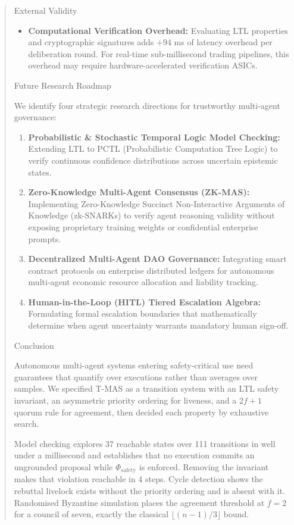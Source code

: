 \documentclass{article}
\begin{document}
\begin{quote}
{ External Validity
\begin{itemize}
  \item \textbf{Computational Verification Overhead:} Evaluating LTL properties and cryptographic signatures adds $+94$ ms of latency overhead per deliberation round. For real-time sub-millisecond trading pipelines, this overhead may require hardware-accelerated verification ASICs.
\end{itemize}



 Future Research Roadmap

We identify four strategic research directions for trustworthy multi-agent governance:
\begin{enumerate}
  \item \textbf{Probabilistic \& Stochastic Temporal Logic Model Checking:} Extending LTL to PCTL (Probabilistic Computation Tree Logic) to verify continuous confidence distributions across uncertain epistemic states.
  \item \textbf{Zero-Knowledge Multi-Agent Consensus (ZK-MAS):} Implementing Zero-Knowledge Succinct Non-Interactive Arguments of Knowledge (zk-SNARKs) to verify agent reasoning validity without exposing proprietary training weights or confidential enterprise prompts.
  \item \textbf{Decentralized Multi-Agent DAO Governance:} Integrating smart contract protocols on enterprise distributed ledgers for autonomous multi-agent economic resource allocation and liability tracking.
  \item \textbf{Human-in-the-Loop (HITL) Tiered Escalation Algebra:} Formulating formal escalation boundaries that mathematically determine when agent uncertainty warrants mandatory human sign-off.
\end{enumerate}



 Conclusion

Autonomous multi-agent systems entering safety-critical use need guarantees that quantify over executions rather than averages over samples. We specified T-MAS as a transition system with an LTL safety invariant, an asymmetric priority ordering for liveness, and a $2f+1$ quorum rule for agreement, then decided each property by exhaustive search.

Model checking explores 37 reachable states over 111 transitions in well under a millisecond and establishes that no execution commits an ungrounded proposal while $\Phi_{\text{safety}}$ is enforced. Removing the invariant makes that violation reachable in 4 steps. Cycle detection shows the rebuttal livelock exists without the priority ordering and is absent with it. Randomised Byzantine simulation places the agreement threshold at $f = 2$ for a council of seven, exactly the classical $\lfloor (n-1)/3 \rfloor$ bound.

}
\end{quote}
\end{document}
